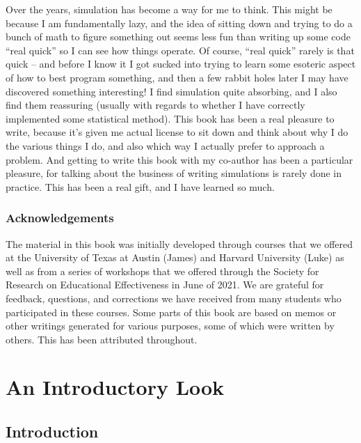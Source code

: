 \documentclass[
]{book}
\begin{document}
Over the years, simulation has become a way for me to think.
This might be because I am fundamentally lazy, and the idea of sitting down and trying to do a bunch of math to figure something out seems less fun than writing up some code ``real quick'' so I can see how things operate. Of course, ``real quick'' rarely is that quick -- and before I know it I got sucked into trying to learn some esoteric aspect of how to best program something, and then a few rabbit holes later I may have discovered something interesting! I find simulation quite absorbing, and I also find them reassuring (usually with regards to whether I have correctly implemented some statistical method). This book has been a real pleasure to write, because it's given me actual license to sit down and think about why I do the various things I do, and also which way I actually prefer to approach a problem. And getting to write this book with my co-author has been a particular pleasure, for talking about the business of writing simulations is rarely done in practice. This has been a real gift, and I have learned so much.

\section*{Acknowledgements}\label{acknowledgements}

The material in this book was initially developed through courses that we offered at the University of Texas at Austin (James) and Harvard University (Luke) as well as from a series of workshops that we offered through the Society for Research on Educational Effectiveness in June of 2021. We are grateful for feedback, questions, and corrections we have received from many students who participated in these courses. Some parts of this book are based on memos or other writings generated for various purposes, some of which were written by others.
This has been attributed throughout.

\part{An Introductory Look}\label{part-an-introductory-look}

\chapter{Introduction}\label{introduction}
\end{document}
